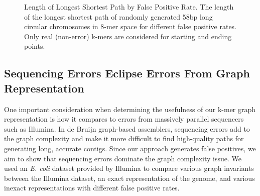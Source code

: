 \documentclass[12pt]{article} \usepackage{simplemargins}
\begin{document}
\begin{figure}
\caption{Length of Longest Shortest Path by False Positive Rate. The 
length of the longest shortest path of randomly generated 58bp 
long circular chromosomes in 8-mer 
space for different false positive rates. Only real (non-error) k-mers are
considered for starting and ending points.}
\end{figure}

\subsection{Sequencing Errors Eclipse Errors From Graph Representation}
One important consideration when determining the usefulness of our k-mer
graph representation is how it compares to errors from massively
parallel sequencers such as Illumina. In de Bruijn graph-based
assemblers, sequencing errors add to the graph complexity and make it
more difficult to find high-quality paths for generating long,
accurate contigs. Since our approach generates
false positives, we aim to show that sequencing errors dominate the graph complexity
issue. We used an \emph{E. coli} dataset provided by Illumina to compare
various graph invariants between the Illumina dataset, an exact
representation of the genome, and various inexact representations with
different false positive rates.
\end{document}
